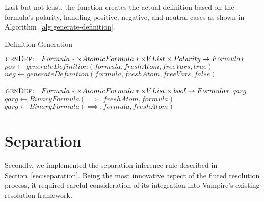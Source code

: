 Last but not least, the  function creates the actual definition based on the formula's polarity, handling positive, negative, and neutral cases as shown in Algorithm~\ref{alg:generate-definition}.

\begin{algorithm}
  \caption{Definition Generation}\label{alg:generate-definition}
  \begin{algorithmic}[1]
      \Statex{}  \(\textsc{genDef:}\quad Formula*\times AtomicFormula*\times VList\times Polarity\to Formula*\)
              \State{} 
            \EndCase{}
              \State{} 
            \EndCase{}
              \State{} \(pos \gets generateDefinition(formula,freshAtom,freeVars,true)\)
              \State{} \(neg \gets generateDefinition(formula,freshAtom,freeVars,false)\)
              \State{} 
            \EndCase{}
          \EndSwitch{}
          \State{} 
      \EndFunction{}
  \end{algorithmic}
  \begin{algorithmic}[1]
      \Statex{}  \(\textsc{genDef:}\quad Formula*\times AtomicFormula*\times VList\times bool\to Formula*\)
          \State{} \(qarg\)
            \State{} \(qarg \gets BinaryFormula(\implies,freshAtom,formula)\)
          \Else{}
            \State{} \(qarg \gets BinaryFormula(\implies,formula,freshAtom)\)
          \EndIf{}
          \State{} 
      \EndFunction{}
  \end{algorithmic}
\end{algorithm}

\section{Separation}\label{sec:separation-impl}
Secondly, we implemented the separation inference rule described in Section~\ref{sec:separation}.
Being the most innovative aspect of the fluted resolution process, it required careful consideration of its integration into Vampire's existing resolution framework.

